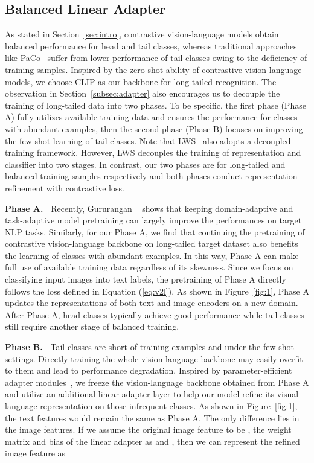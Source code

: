 \documentclass[10pt,twocolumn,letterpaper]{article}
\begin{document}
\subsection{Balanced Linear Adapter}
As stated in Section~\ref{sec:intro}, contrastive vision-language models obtain balanced performance for head and tail classes, whereas traditional approaches like PaCo~\cite{cui2021parametric} suffer from lower performance of tail classes owing to the deficiency of training samples. Inspired by the zero-shot ability of contrastive vision-language models, we choose CLIP as our backbone for long-tailed recognition. The observation in Section~\ref{subsec:adapter} also encourages us to decouple the training of long-tailed data into two phases. To be specific, the first phase (Phase A) fully utilizes available training data and ensures the performance for classes with abundant examples, then the second phase (Phase B) focuses on improving the few-shot learning of tail classes. Note that LWS~\cite{Kang2020Decoupling} also adopts a decoupled training framework. However, LWS decouples the training of representation and classifier into two stages. In contrast, our two phases are for long-tailed and balanced training samples respectively and both phases conduct representation refinement with contrastive loss.

\noindent\textbf{Phase A.~} Recently, Gururangan \etal~\cite{gururangan2020don} shows that keeping domain-adaptive and task-adaptive model pretraining can largely improve the performances on target NLP tasks. Similarly, for our Phase A, we find that continuing the pretraining of contrastive vision-language backbone on long-tailed target dataset also benefits the learning of classes with abundant examples. In this way, Phase A can make full use of available training data regardless of its skewness. Since we focus on classifying input images into text labels, the pretraining of Phase A directly follows the loss defined in Equation (\ref{eq:v2l}). As shown in Figure~\ref{fig:1}, Phase A updates the representations of both text and image encoders on a new domain. After Phase A, head classes typically achieve good performance while tail classes still require another stage of balanced training.

\noindent\textbf{Phase B.~} Tail classes are short of training examples and under the few-shot settings. Directly training the whole vision-language backbone may easily overfit to them and lead to performance degradation. Inspired by parameter-efficient adapter modules~\cite{houlsby2019parameter}, we freeze the vision-language backbone obtained from Phase A  and utilize an additional linear adapter layer to help our model refine its visual-language representation on those infrequent classes. 
As shown in Figure~\ref{fig:1}, the text features would remain the same as Phase A. The only difference lies in the image features. If we assume the original image feature to be , the weight matrix and bias of the linear adapter as  and , then we can represent the refined image feature  as
\end{document}
